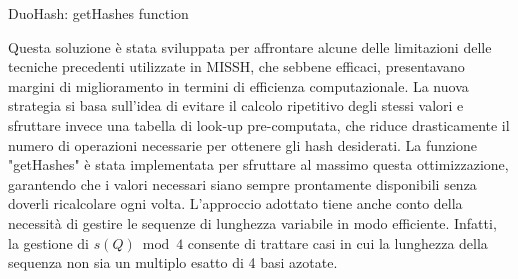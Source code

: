 \begin{algorithm}[!ht]
	\caption{DuoHash: getHashes function}
	\label{alg:DuoHash}
	
\end{algorithm}

Questa soluzione è stata sviluppata per affrontare alcune delle limitazioni delle tecniche precedenti utilizzate in MISSH, che sebbene efficaci, presentavano margini di miglioramento in termini di efficienza computazionale. La nuova strategia si basa sull'idea di evitare il calcolo ripetitivo degli stessi valori e sfruttare invece una tabella di look-up pre-computata, che riduce drasticamente il numero di operazioni necessarie per ottenere gli hash desiderati. La funzione "getHashes" è stata implementata per sfruttare al massimo questa ottimizzazione, garantendo che i valori necessari siano sempre prontamente disponibili senza doverli ricalcolare ogni volta. L'approccio adottato tiene anche conto della necessità di gestire le sequenze di lunghezza variabile in modo efficiente. Infatti, la gestione di $s(Q) \bmod 4$ consente di trattare casi in cui la lunghezza della sequenza non sia un multiplo esatto di 4 basi azotate. 

